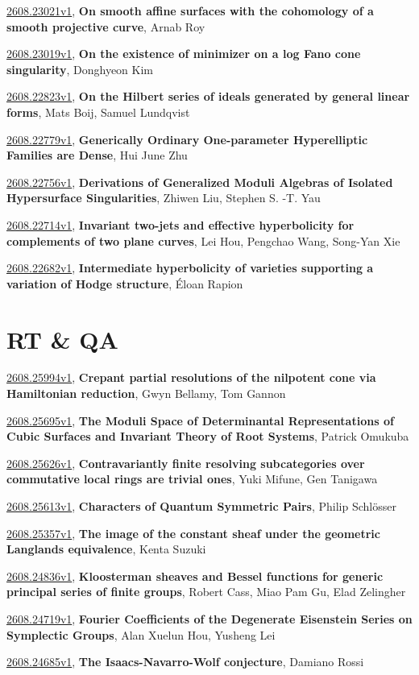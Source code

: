 \documentclass[9pt, a4paper]{article}
\theoremstyle{plain}
\theoremstyle{definition}
\theoremstyle{remark}
\newcommand{\arxiv}[3]{\href{https://arxiv.org/abs/#1}{#1}, \textbf{\textcolor{arxivblue}{#2}}, #3}
\begin{document}
\arxiv{2608.23021v1}{On smooth affine surfaces with the cohomology of a smooth projective curve}{Arnab Roy}

\arxiv{2608.23019v1}{On the existence of minimizer on a log Fano cone singularity}{Donghyeon Kim}

\arxiv{2608.22823v1}{On the Hilbert series of ideals generated by general linear forms}{Mats Boij, Samuel Lundqvist}

\arxiv{2608.22779v1}{Generically Ordinary One-parameter Hyperelliptic Families are Dense}{Hui June Zhu}

\arxiv{2608.22756v1}{Derivations of Generalized Moduli Algebras of Isolated Hypersurface Singularities}{Zhiwen Liu, Stephen S. -T. Yau}

\arxiv{2608.22714v1}{Invariant two-jets and effective hyperbolicity for complements of two plane curves}{Lei Hou, Pengchao Wang, Song-Yan Xie}

\arxiv{2608.22682v1}{Intermediate hyperbolicity of varieties supporting a variation of Hodge structure}{Éloan Rapion}


\section{RT \& QA}
\arxiv{2608.25994v1}{Crepant partial resolutions of the nilpotent cone via Hamiltonian reduction}{Gwyn Bellamy, Tom Gannon}

\arxiv{2608.25695v1}{The Moduli Space of Determinantal Representations of Cubic Surfaces and Invariant Theory of Root Systems}{Patrick Omukuba}

\arxiv{2608.25626v1}{Contravariantly finite resolving subcategories over commutative local rings are trivial ones}{Yuki Mifune, Gen Tanigawa}

\arxiv{2608.25613v1}{Characters of Quantum Symmetric Pairs}{Philip Schlösser}

\arxiv{2608.25357v1}{The image of the constant sheaf under the geometric Langlands equivalence}{Kenta Suzuki}

\arxiv{2608.24836v1}{Kloosterman sheaves and Bessel functions for generic principal series of finite groups}{Robert Cass, Miao Pam Gu, Elad Zelingher}

\arxiv{2608.24719v1}{Fourier Coefficients of the Degenerate Eisenstein Series on Symplectic Groups}{Alan Xuelun Hou, Yusheng Lei}

\arxiv{2608.24685v1}{The Isaacs-Navarro-Wolf conjecture}{Damiano Rossi}
\end{document}
